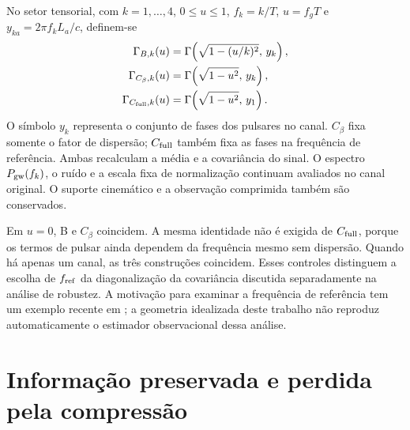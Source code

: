 No setor tensorial, com \(k=1,\ldots,4\), \(0\leq u\leq1\), \(f_k=k/T\), \(u=f_gT\) e \(y_{ka}=2\pi f_kL_a/c\), definem-se
\begin{align}
 \Gamma_{B,k}(u)&=\Gamma\!\left(\sqrt{1-(u/k)^2},\,y_k\right),\nonumber\\
 \Gamma_{C_\beta,k}(u)&=\Gamma\!\left(\sqrt{1-u^2},\,y_k\right),\nonumber\\
 \Gamma_{C_{\rm full},k}(u)&=\Gamma\!\left(\sqrt{1-u^2},\,y_1\right).
 \label{eq:comp-respostas}
\end{align}
O símbolo \(y_k\) representa o conjunto de fases dos pulsares no canal.
\(C_\beta\) fixa somente o fator de dispersão; \(C_{\rm full}\) também
fixa as fases na frequência de referência. Ambas recalculam a média e a
covariância do sinal. O espectro \(P_{\rm gw}(f_k)\), o ruído e a escala
fixa de normalização continuam avaliados no canal original. O suporte
cinemático e a observação comprimida também são conservados.

Em \(u=0\), B e \(C_\beta\) coincidem. A mesma identidade não é exigida
de \(C_{\rm full}\), porque os termos de pulsar ainda dependem da frequência
mesmo sem dispersão. Quando há apenas um canal, as três construções coincidem.
Esses controles distinguem a escolha de \(f_{\rm ref}\) da diagonalização
da covariância discutida separadamente na análise de robustez. A motivação
para examinar a frequência de referência tem um exemplo recente em
\textcite{zhao2026}; a geometria idealizada deste trabalho não reproduz
automaticamente o estimador observacional dessa análise.

\section{Informação preservada e perdida pela compressão}

